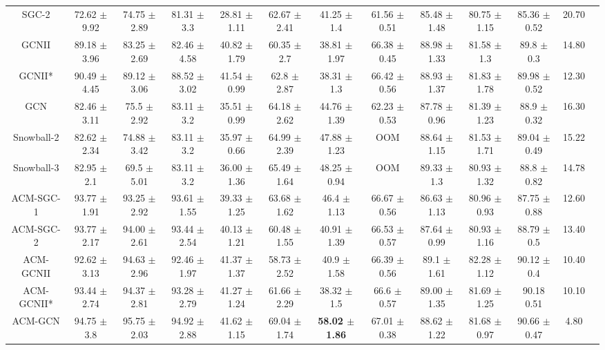 \documentclass{article}
\newcommand{\0}{{\boldsymbol{0}}}
\newcommand{\6}{{\partial}}
\newcommand{\8}{{\infty}}
\newcommand{\4}{{\nabla}}
\begin{document}
\begin{table}[htbp]
\begin{tabular}{c|cccccccccc|cc}
    SGC-2 & 72.62 $\pm$ 9.92 & 74.75 $\pm$ 2.89 & 81.31 $\pm$ 3.3 & 28.81 $\pm$ 1.11 & 62.67 $\pm$ 2.41 & 41.25 $\pm$ 1.4 & 61.56 $\pm$ 0.51 & 85.48 $\pm$ 1.48 & 80.75 $\pm$ 1.15 & 85.36 $\pm$ 0.52 & 20.70 \\
    GCNII & 89.18 $\pm$ 3.96 & 83.25 $\pm$ 2.69 & 82.46 $\pm$ 4.58 & 40.82 $\pm$ 1.79 & 60.35 $\pm$ 2.7 & 38.81 $\pm$ 1.97 & 66.38 $\pm$ 0.45 & 88.98 $\pm$ 1.33 & 81.58 $\pm$ 1.3 & 89.8 $\pm$ 0.3 & 14.80 \\
    GCNII* & 90.49 $\pm$ 4.45 & 89.12 $\pm$ 3.06 & 88.52 $\pm$ 3.02 & 41.54 $\pm$ 0.99 & 62.8 $\pm$ 2.87 & 38.31 $\pm$ 1.3 & 66.42 $\pm$ 0.56 & 88.93 $\pm$ 1.37 & 81.83 $\pm$ 1.78 & 89.98 $\pm$ 0.52 & 12.30 \\
    GCN   & 82.46 $\pm$ 3.11 & 75.5 $\pm$ 2.92 & 83.11 $\pm$ 3.2 & 35.51 $\pm$ 0.99 & 64.18 $\pm$ 2.62 & 44.76 $\pm$ 1.39 & 62.23 $\pm$ 0.53 & 87.78 $\pm$ 0.96 & 81.39 $\pm$ 1.23 & 88.9 $\pm$ 0.32 & 16.30 \\
    Snowball-2 & 82.62 $\pm$ 2.34 & 74.88 $\pm$ 3.42 & 83.11 $\pm$ 3.2 & 35.97 $\pm$ 0.66 & 64.99 $\pm$ 2.39 & 47.88 $\pm$ 1.23 & OOM   & 88.64 $\pm$ 1.15 & 81.53 $\pm$ 1.71 & 89.04 $\pm$ 0.49 & 15.22 \\
    Snowball-3 & 82.95 $\pm$ 2.1 & 69.5 $\pm$ 5.01 & 83.11 $\pm$ 3.2 & 36.00 $\pm$ 1.36 & 65.49 $\pm$ 1.64 & 48.25 $\pm$ 0.94 & OOM   & 89.33 $\pm$ 1.3 & 80.93 $\pm$ 1.32 & 88.8 $\pm$ 0.82 & 14.78 \\
    \midrule
    ACM-SGC-1 & 93.77 $\pm$ 1.91 & 93.25 $\pm$ 2.92 & 93.61 $\pm$ 1.55 & 39.33 $\pm$ 1.25 & 63.68 $\pm$ 1.62 & 46.4 $\pm$ 1.13 & 66.67 $\pm$ 0.56 & 86.63 $\pm$ 1.13 & 80.96 $\pm$ 0.93 & 87.75 $\pm$ 0.88 & 12.60 \\
    ACM-SGC-2 & 93.77 $\pm$ 2.17 & 94.00 $\pm$ 2.61 & 93.44 $\pm$ 2.54 & 40.13 $\pm$ 1.21 & 60.48 $\pm$ 1.55 & 40.91 $\pm$ 1.39 & 66.53 $\pm$ 0.57 & 87.64 $\pm$ 0.99 & 80.93 $\pm$ 1.16 & 88.79 $\pm$ 0.5 & 13.40 \\
    ACM-GCNII & 92.62 $\pm$ 3.13 & 94.63 $\pm$ 2.96 & 92.46 $\pm$ 1.97 & 41.37 $\pm$ 1.37 & 58.73 $\pm$ 2.52 & 40.9 $\pm$ 1.58 & 66.39 $\pm$ 0.56 & 89.1 $\pm$ 1.61 & 82.28 $\pm$ 1.12 & 90.12 $\pm$ 0.4 & 10.40 \\
    ACM-GCNII* & 93.44 $\pm$ 2.74 & 94.37 $\pm$ 2.81 & 93.28 $\pm$ 2.79 & 41.27 $\pm$ 1.24 & 61.66 $\pm$ 2.29 & 38.32 $\pm$ 1.5 & 66.6 $\pm$ 0.57 & 89.00 $\pm$ 1.35 & 81.69 $\pm$ 1.25 & 90.18 0.51 & 10.10 \\
    ACM-GCN & 94.75 $\pm$ 3.8 & 95.75 $\pm$ 2.03 & 94.92 $\pm$ 2.88 & 41.62 $\pm$ 1.15 & 69.04 $\pm$ 1.74 & \cellcolor[rgb]{ .816,  .808,  .808}\textbf{58.02 $\pm$ 1.86} & 67.01 $\pm$ 0.38 & 88.62 $\pm$ 1.22 & 81.68 $\pm$ 0.97 & 90.66 $\pm$ 0.47 & 4.80 \\

\end{tabular}
\end{table}
\end{document}
